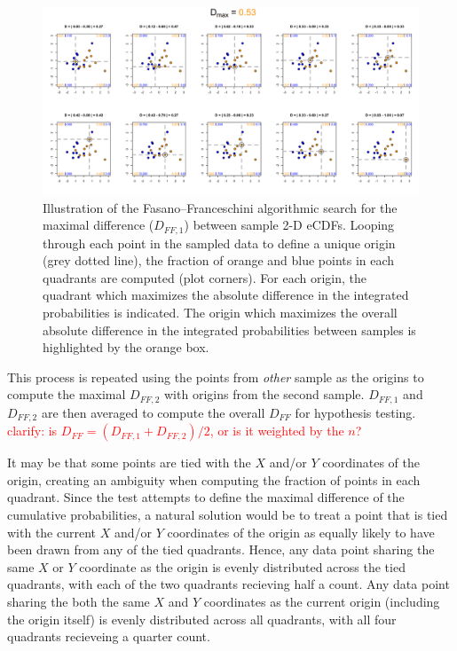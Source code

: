 \documentclass[codesnippet]{jss}
\newcommand{\RBnote}[1]{\textcolor{red}{#1}}
\begin{document}
\begin{figure}[t!]
\centering
\includegraphics{fftestOutput}
\caption{\label{fig:kstest2D} Illustration of the Fasano--Franceschini algorithmic search for the maximal difference ($D_{FF,1}$) between sample 2-D eCDFs. Looping through each point in the sampled data to define a unique origin (grey dotted line), the fraction of orange and blue points in each quadrants are computed (plot corners). For each origin, the quadrant which maximizes the absolute difference in the integrated probabilities is indicated. The origin which maximizes the overall absolute difference in the integrated probabilities between samples is highlighted by the orange box.
}
\end{figure}

This process is repeated using the points from \textit{other} sample
as the origins to compute the maximal $D_{FF,2}$ with origins from the
second sample. $D_{FF,1}$ and $D_{FF,2}$  are then averaged to compute
the overall $D_{FF}$ for hypothesis testing. \RBnote{clarify: is
$D_{FF}=(D_{FF,1}+D_{FF,2})/2$, or is it weighted by the $n$?}

It may be that some points are tied with the $X$ and/or $Y$
coordinates of the origin, creating an ambiguity when computing the
fraction of points in each quadrant. Since the 
test attempts to define the maximal difference of the cumulative
probabilities, a natural solution would be to treat a point that is
tied with the current $X$ and/or $Y$ coordinates of the origin as equally
likely to have been drawn from any of the tied quadrants. 
Hence, any data point
sharing the same $X$ or $Y$ coordinate as the origin is evenly
distributed across the tied quadrants, with each of the two quadrants
recieving half a count. Any data point sharing the both the same $X$ and $Y$
coordinates as the current origin (including the origin itself) is evenly
distributed across all quadrants, with all four quadrants recieveing a
quarter count.
\end{document}
